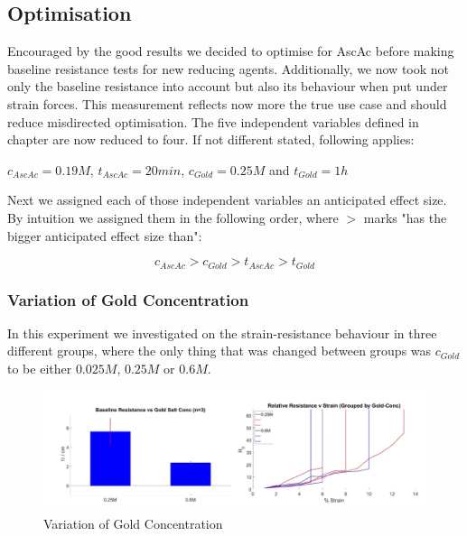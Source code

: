 \subsection{Optimisation}

Encouraged by the good results we decided to optimise for AscAc before making baseline resistance tests for new reducing agents. Additionally, we now took not only the baseline resistance into account but also its behaviour when put under strain forces. This measurement reflects now more the true use case and should reduce misdirected optimisation. The five independent variables defined in chapter are now reduced to four. If not different stated, following applies: 

\begin{center}$c_{AscAc}=0.19M$, $t_{AscAc}=20min$, $c_{Gold}=0.25M$ and $t_{Gold}=1h$
\end{center}
Next we assigned each of those independent variables an anticipated effect size. By intuition we assigned them in the following order, where $>$ marks "has the bigger anticipated effect size than":

\begin{equation}
    c_{AscAc} > c_{Gold} > t_{AscAc} > t_{Gold}
\end{equation}

\subsubsection{Variation of Gold Concentration}

In this experiment we investigated on the strain-resistance behaviour in three different groups, where the only thing that was changed between groups was $c_{Gold}$ to be either $0.025M$, $0.25M$ or $0.6M$.

\begin{figure}[H]
    \centerline{\includegraphics[width=\textwidth]{./pic/R0vGoldConc.PNG}}
    \caption{Variation of Gold Concentration}
    \label{fig:GoldConc}
\end{figure}



